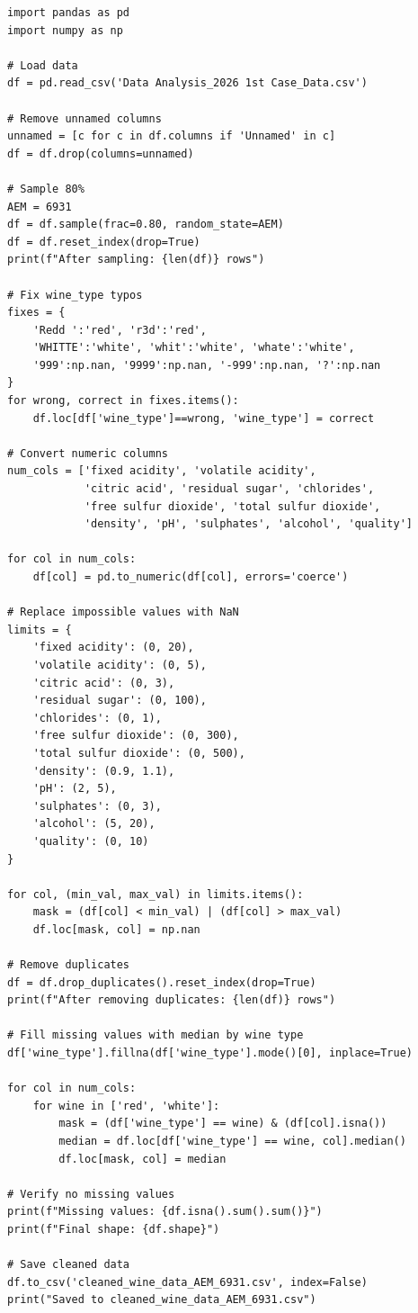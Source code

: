 \documentclass[12pt,a4paper]{article}
\begin{document}
\begin{lstlisting}
import pandas as pd
import numpy as np

# Load data
df = pd.read_csv('Data Analysis_2026 1st Case_Data.csv')

# Remove unnamed columns
unnamed = [c for c in df.columns if 'Unnamed' in c]
df = df.drop(columns=unnamed)

# Sample 80%
AEM = 6931
df = df.sample(frac=0.80, random_state=AEM)
df = df.reset_index(drop=True)
print(f"After sampling: {len(df)} rows")

# Fix wine_type typos
fixes = {
    'Redd ':'red', 'r3d':'red', 
    'WHITTE':'white', 'whit':'white', 'whate':'white',
    '999':np.nan, '9999':np.nan, '-999':np.nan, '?':np.nan
}
for wrong, correct in fixes.items():
    df.loc[df['wine_type']==wrong, 'wine_type'] = correct

# Convert numeric columns
num_cols = ['fixed acidity', 'volatile acidity', 
            'citric acid', 'residual sugar', 'chlorides', 
            'free sulfur dioxide', 'total sulfur dioxide',
            'density', 'pH', 'sulphates', 'alcohol', 'quality']

for col in num_cols:
    df[col] = pd.to_numeric(df[col], errors='coerce')

# Replace impossible values with NaN
limits = {
    'fixed acidity': (0, 20),
    'volatile acidity': (0, 5),
    'citric acid': (0, 3),
    'residual sugar': (0, 100),
    'chlorides': (0, 1),
    'free sulfur dioxide': (0, 300),
    'total sulfur dioxide': (0, 500),
    'density': (0.9, 1.1),
    'pH': (2, 5),
    'sulphates': (0, 3),
    'alcohol': (5, 20),
    'quality': (0, 10)
}

for col, (min_val, max_val) in limits.items():
    mask = (df[col] < min_val) | (df[col] > max_val)
    df.loc[mask, col] = np.nan

# Remove duplicates
df = df.drop_duplicates().reset_index(drop=True)
print(f"After removing duplicates: {len(df)} rows")

# Fill missing values with median by wine type
df['wine_type'].fillna(df['wine_type'].mode()[0], inplace=True)

for col in num_cols:
    for wine in ['red', 'white']:
        mask = (df['wine_type'] == wine) & (df[col].isna())
        median = df.loc[df['wine_type'] == wine, col].median()
        df.loc[mask, col] = median

# Verify no missing values
print(f"Missing values: {df.isna().sum().sum()}")
print(f"Final shape: {df.shape}")

# Save cleaned data
df.to_csv('cleaned_wine_data_AEM_6931.csv', index=False)
print("Saved to cleaned_wine_data_AEM_6931.csv")
\end{lstlisting}
\end{document}
